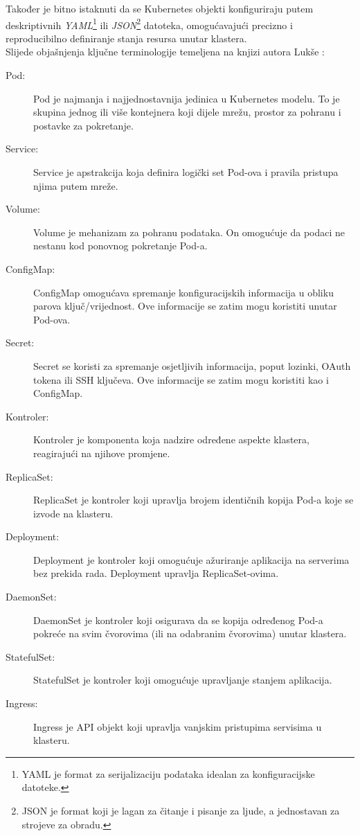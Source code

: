 \documentclass[times, utf8, diplomski]{fer}
\begin{document}
Također je bitno istaknuti da se Kubernetes objekti konfiguriraju putem deskriptivnih \emph{YAML}\footnote{YAML  je format za serijalizaciju podataka idealan za konfiguracijske datoteke.} ili \emph{JSON}\footnote{JSON  je format koji je lagan za čitanje i pisanje za ljude, a jednostavan za strojeve za obradu.} datoteka, omogućavajući precizno i reproducibilno definiranje stanja resursa unutar klastera.\\

Slijede objašnjenja ključne terminologije temeljena na knjizi autora Lukše \citep{luksa_kubernetes_2023}:

\begin{description} 
	\item[Pod:] Pod je najmanja i najjednostavnija jedinica u Kubernetes modelu. To je skupina jednog ili više kontejnera koji dijele mrežu, prostor za pohranu i postavke za pokretanje.
	\item[Service:] Service je apstrakcija koja definira logički set Pod-ova i pravila pristupa njima putem mreže.
	\item[Volume:] Volume je mehanizam za pohranu podataka. On omogućuje da podaci ne nestanu kod ponovnog pokretanje Pod-a.
	\item[ConfigMap:] ConfigMap omogućava spremanje konfiguracijskih informacija u obliku parova ključ/vrijednost. Ove informacije se zatim mogu koristiti unutar Pod-ova.
	\item[Secret:] Secret se koristi za spremanje osjetljivih informacija, poput lozinki, OAuth tokena ili SSH ključeva. Ove informacije se zatim mogu koristiti kao i ConfigMap.
	\item[Kontroler:] Kontroler je komponenta koja nadzire određene aspekte klastera, reagirajući na njihove promjene.
	\item[ReplicaSet:] ReplicaSet je kontroler koji upravlja brojem identičnih kopija Pod-a koje se izvode na klasteru.
	\item[Deployment:] Deployment je kontroler koji omogućuje ažuriranje aplikacija na serverima bez prekida rada. Deployment upravlja ReplicaSet-ovima.
	\item[DaemonSet:] DaemonSet je kontroler koji osigurava da se kopija određenog Pod-a pokreće na svim čvorovima (ili na odabranim čvorovima) unutar klastera.
	\item[StatefulSet:] StatefulSet je kontroler koji omogućuje upravljanje stanjem aplikacija.
	\item[Ingress:] Ingress je API objekt koji upravlja vanjskim pristupima servisima u klasteru.

\end{description}
\end{document}
